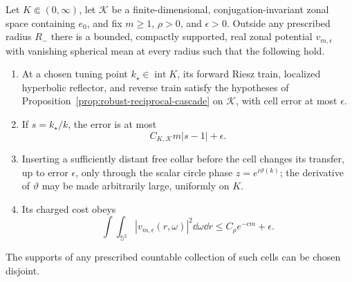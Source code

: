 \begin{proposition}
\label{prop:scalar-reciprocal-riesz-cell}
Let $K\Subset(0,\infty)$, let $\mathcal K$ be a finite-dimensional,
conjugation-invariant zonal space containing $e_0$, and fix $m\geq1$,
$\rho>0$, and $\epsilon>0$.  Outside any prescribed radius $R_-$ there is a
bounded, compactly supported, real zonal potential $v_{m,\epsilon}$ with
vanishing spherical mean at every radius such that the following hold.

\begin{enumerate}
 \item At a chosen tuning point $k_\star\in\operatorname{int}K$, its forward
 Riesz train, localized hyperbolic reflector, and reverse train satisfy the
 hypotheses of Proposition~\ref{prop:robust-reciprocal-cascade} on
 $\mathcal K$, with cell error at most $\epsilon$.
 \item If $s=k_\star/k$, the error is at most
 \begin{equation}
   C_{K,\mathcal K}m|s-1|+\epsilon.
   \label{eq:physical-riesz-cell-chromatic-error}
 \end{equation}
 \item Inserting a sufficiently distant free collar before the cell changes
 its transfer, up to error $\epsilon$, only through the scalar circle phase
 $z=e^{i\vartheta(k)}$; the derivative of $\vartheta$ may be made arbitrarily
 large, uniformly on $K$.
 \item Its charged cost obeys
 \begin{equation}
  \int\!\int_{\mathbb S^2}|v_{m,\epsilon}(r,\omega)|^2
       \dd\omega\dd r
  \leq C_\rho e^{-c m}+\epsilon.
  \label{eq:physical-riesz-cell-cost}
 \end{equation}
\end{enumerate}
The supports of any prescribed countable collection of such cells can be
chosen disjoint.
\end{proposition}

